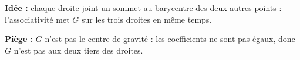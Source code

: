 \textbf{Idée :} chaque droite joint un sommet au barycentre des deux autres points : l'associativité met $G$ sur les trois droites en même temps.

\textbf{Piège :} $G$ n'est pas le centre de gravité : les coefficients ne sont pas égaux, donc $G$ n'est pas aux deux tiers des droites.
